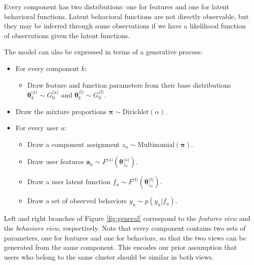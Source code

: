 \documentclass[smallextended]{svjour3}          %
\begin{document}
Every component has two distributions: one for features and one for latent behavioral functions. Latent behavioral functions are not directly observable, but they may be inferred through some observations if we have a likelihood function of observations given the latent functions.   

The model can also be expressed in terms of a generative process:
\begin{itemize}
\item For every component $k$:
   \begin{itemize}
   \item Draw feature and function parameters from their base distributions $\boldsymbol{\theta}_k^{\text{(a)}} \sim G_0^{\text{(a)}}$ and $ \boldsymbol{\theta}_k^{\text{(f)}} \sim G_0^{\text{(f)}}$.
   \end{itemize}
\item Draw the mixture proportions $\boldsymbol{\pi} \sim \text{Dirichlet}(\alpha)$.
\item For every user $u$:
   \begin{itemize}
   \item Draw a component assignment $z_u \sim \text{Multinomial}(\boldsymbol{\pi})$.
   \item Draw user features  $\mathbf{a}_u \sim F^{\text{(a)}}(\boldsymbol{\theta}_{z_u}^{\text{(a)}})$. 
   \item Draw a user latent function $f_u \sim F^{\text{(f)}}(\boldsymbol{\theta}_{z_u}^{\text{(f)}})$.
   \item Draw a set of observed behaviors $y_u \sim p(y_u | f_u)$.
   \end{itemize}
\end{itemize}

Left and right branches of Figure \ref{fig:general}  correspond to the \textit{features view} and the \textit{behaviors view}, respectively. Note that every component contains two sets of parameters, one for features and one for behaviors, so that the two views can be generated from the same component. This encodes our prior assumption that users who belong to the same cluster should be similar in both views.
\end{document}
